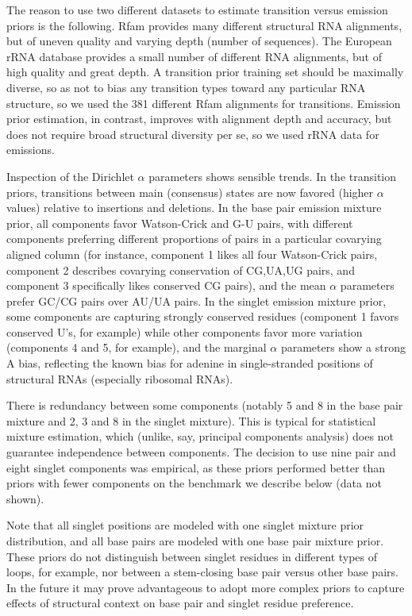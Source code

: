 \documentclass[11pt]{article}
\begin{document}
The reason to use two different datasets to estimate transition versus
emission priors is the following. Rfam provides many different
structural RNA alignments, but of uneven quality and varying depth
(number of sequences). The European rRNA database provides a small
number of different RNA alignments, but of high quality and great
depth.  A transition prior training set should be maximally diverse,
so as not to bias any transition types toward any particular RNA
structure, so we used the 381 different Rfam alignments for
transitions.  Emission prior estimation, in contrast, improves with
alignment depth and accuracy, but does not require broad structural
diversity per se, so we used rRNA data for emissions.

Inspection of the Dirichlet $\alpha$ parameters shows sensible
trends. In the transition priors, transitions between main (consensus)
states are now favored (higher $\alpha$ values) relative to insertions
and deletions.  In the base pair emission mixture prior, all
components favor Watson-Crick and G-U pairs, with different components
preferring different proportions of pairs in a particular covarying
aligned column (for instance, component 1 likes all four Watson-Crick
pairs, component 2 describes covarying conservation of CG,UA,UG pairs,
and component 3 specifically likes conserved CG pairs), and the mean
$\alpha$ parameters prefer GC/CG pairs over AU/UA pairs. In the
singlet emission mixture prior, some components are capturing strongly
conserved residues (component 1 favors conserved U's, for example)
while other components favor more variation (components 4 and 5, for
example), and the marginal $\alpha$ parameters show a strong A bias,
reflecting the known bias for adenine in single-stranded positions of
structural RNAs (especially ribosomal RNAs).

There is redundancy between some components (notably 5 and 8
in the base pair mixture and 2, 3 and 8 in the singlet mixture). This
is typical for statistical mixture estimation, which (unlike, say,
principal components analysis) does not guarantee independence between
components. The decision to use nine pair and eight singlet components
was empirical, as these priors performed better than priors with fewer
components on the benchmark we describe below (data not shown).

Note that all singlet positions are modeled with one singlet mixture
prior distribution, and all base pairs are modeled with one base pair
mixture prior. These priors do not distinguish between singlet
residues in different types of loops, for example, nor between a
stem-closing base pair versus other base pairs. In the future it may
prove advantageous to adopt more complex priors to capture 
effects of structural context on base pair and singlet residue
preference.
\end{document}
